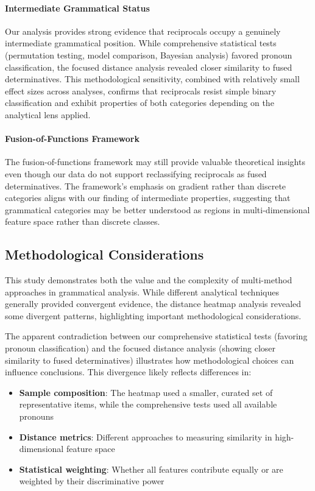 \documentclass[12pt]{article}
\begin{document}
\paragraph{Intermediate Grammatical Status}
Our analysis provides strong evidence that reciprocals occupy a genuinely intermediate grammatical position. While comprehensive statistical tests (permutation testing, model comparison, Bayesian analysis) favored pronoun classification, the focused distance analysis revealed closer similarity to fused determinatives. This methodological sensitivity, combined with relatively small effect sizes across analyses, confirms that reciprocals resist simple binary classification and exhibit properties of both categories depending on the analytical lens applied.

\paragraph{Fusion-of-Functions Framework}
The fusion-of-functions framework \citep{payne2007fusion} may still provide valuable theoretical insights even though our data do not support reclassifying reciprocals as fused determinatives. The framework's emphasis on gradient rather than discrete categories aligns with our finding of intermediate properties, suggesting that grammatical categories may be better understood as regions in multi-dimensional feature space rather than discrete classes.

\subsection{Methodological Considerations}

This study demonstrates both the value and the complexity of multi-method approaches in grammatical analysis. While different analytical techniques generally provided convergent evidence, the distance heatmap analysis revealed some divergent patterns, highlighting important methodological considerations.

The apparent contradiction between our comprehensive statistical tests (favoring pronoun classification) and the focused distance analysis (showing closer similarity to fused determinatives) illustrates how methodological choices can influence conclusions. This divergence likely reflects differences in:

\begin{itemize}
\item \textbf{Sample composition}: The heatmap used a smaller, curated set of representative items, while the comprehensive tests used all available pronouns
\item \textbf{Distance metrics}: Different approaches to measuring similarity in high-dimensional feature space
\item \textbf{Statistical weighting}: Whether all features contribute equally or are weighted by their discriminative power
\end{itemize}
\end{document}
